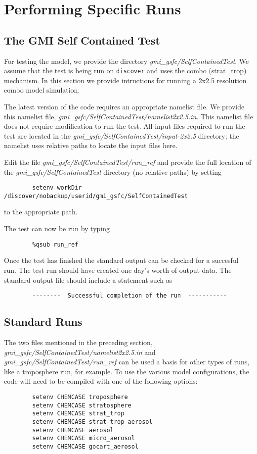 %
\chapter[Performing Specific Runs]{Performing Specific Runs}
\label{chap:runs}
%
%
\section{The GMI Self  Contained Test} \label{sec:SelfContainedTest}
%
For testing the model, we provide the directory {\em gmi\_gsfc/SelfContainedTest}.
We assume that the test is being run on {\tt discover} and uses the combo (strat\_trop)
mechanism.  In this section we provide intructions for running a 2x2.5
resolution combo model simulation.

The latest version of the code requires an appropriate namelist file.  We provide
this namelist file, {\em gmi\_gsfc/SelfContainedTest/namelist2x2.5.in}.
This namelist file does not require modification to run the test.  
All input files required to run the test are located in the
{\em gmi\_gsfc/SelfContainedTest/input-2x2.5} directory; the namelist uses relative
paths to locate the input files here.

Edit the file {\em gmi\_gsfc/SelfContainedTest/run\_ref} and provide the full location 
of the 
{\em gmi\_gsfc/SelfContainedTest} directory (no relative paths) by 
setting 
%
\begin{verbatim}
        setenv workDir /discover/nobackup/userid/gmi_gsfc/SelfContainedTest
\end{verbatim}
%
to the appropriate path.

The test can now be run by typing
%
\begin{verbatim}
        %qsub run_ref
\end{verbatim}
%

Once the test has finished the standard output can be checked for a succesful run.
The test run should have created one day's worth of output data.  The standard 
output file should include a statement such as
%
\begin{verbatim}
        --------  Successful completion of the run  -----------
\end{verbatim}

\section{Standard Runs} \label{sec:StandardRuns}

The two files mentioned in the preceding section, {\em gmi\_gsfc/SelfContainedTest/namelist2x2.5.in} and
{\em gmi\_gsfc/SelfContainedTest/run\_ref} can be used a basis for other types of
runs, like a troposphere run, for example.  To use the various model configurations, the code
will need to be compiled with one of the following options:
%
\begin{verbatim}
        setenv CHEMCASE troposphere
        setenv CHEMCASE stratosphere
        setenv CHEMCASE strat_trop
        setenv CHEMCASE strat_trop_aerosol
        setenv CHEMCASE aerosol
        setenv CHEMCASE micro_aerosol
        setenv CHEMCASE gocart_aerosol
\end{verbatim}
%

